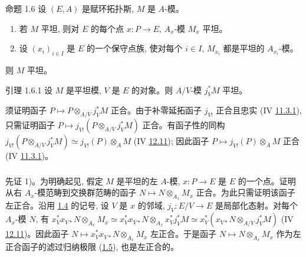 \begin{enonce*}{命题 1.6}
设 $(E,A)$ 是赋环拓扑斯, $M$ 是 $A$-模。
\begin{enumerate}
\renewcommand{\labelenumi}{\theenumi)}
\item 若 $M$ 平坦, 则对 $E$ 的每个点 $x:P\to E$, $A_x$-模 $M_x$ 平坦。
\item 设 $(x_i)_{i\in I}$ 是 $E$ 的一个保守点族, 使对每个 $i\in I$, $M_{x_i}$ 都是平坦的 $A_{x_i}$-模。
\end{enumerate}
则 $M$ 平坦。
\end{enonce*}

\begin{enonce*}{引理 1.6.1}
设 $M$ 是平坦模, $V$ 是 $E$ 的对象。则 $A/V$-模 $j^{\ast}_VM$ 平坦。
\end{enonce*}

须证明函子 $P\longmapsto P\otimes_{A/V}j^{\ast}_VM$ 正合。由于补零延拓函子 $j_{V!}$ 正合且忠实 (IV \hyperref[IV.prop11.3.1]{11.3.1}), 只需证明函子 $P\longmapsto j_{V!}(P\otimes_{A/V}j^{\ast}_VM)$ 正合。有函子性的同构\pageoriginale $j_{V!}(P\otimes_{A/V}j^{\ast}_VM)\simeq
j_{V!}(P)\otimes_A M$ (IV \hyperref[IV.prop12.11]{12.11}); 因此函子 $P\longmapsto j_{V!}(P)\otimes_A M$ 正合 (IV \hyperref[IV.prop11.3.1]{11.3.1})。

\setcounter{subsection}{6}
\setcounter{subsubsection}{1}


\subsubsection{}
先证 1)。为明确起见, 假定 $M$ 是平坦的左 $A$-模, $x:P\to E$ 是 $E$ 的一个点。证明从右 $A_x$-模范畴到交换群范畴的函子 $N\mapsto N\otimes_{A_x}M_x$ 正合。为此只需证明该函子左正合。沿用 \hyperref[V.subsec1.4]{1.4} 的记号, 设 $V$ 是 $x$ 的邻域, $j_V:E/V\to E$ 是局部化态射。对每个 $A_x$-模 $N$, 有 $x_V^\ast x_{V\ast}N\otimes_{A_x}M_x\simeq
x_V^\ast x_{V\ast}N\otimes_{A_x}x_V^\ast j_V^\ast M\simeq
x_V^\ast(x_{V\ast}N\otimes_{A/V}j_V^\ast M)$ (IV \hyperref[IV.prop12.11]{12.11})。因此函子 $N\mapsto x_V^\ast x_{V\ast}N\otimes_{A_x}M_x$ 左正合。于是函子 $N\mapsto N\otimes_{A_x}M_x$ 作为左正合函子的滤过归纳极限 (\hyperref[V.prop1.5]{1.5}), 也是左正合的。

